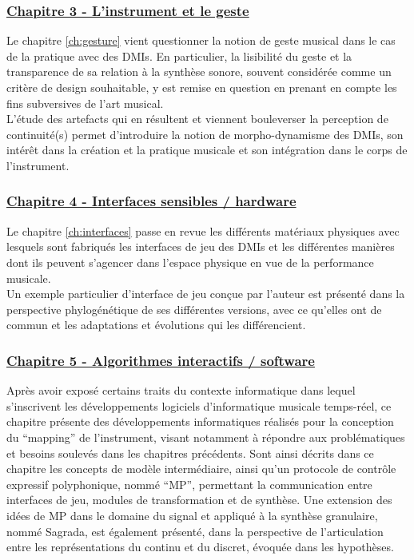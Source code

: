 \subsubsection*{\hyperref[ch:gesture]{Chapitre 3 - L'instrument et le geste}}

\noindent Le chapitre \ref{ch:gesture} vient questionner la notion de geste musical dans le cas de la pratique avec des \glspl{DMI}. En particulier, la lisibilité du geste et la transparence de sa relation à la synthèse sonore, souvent considérée comme un critère de design souhaitable, y est remise en question en prenant en compte les fins subversives de l'art musical.\\
\indent L'étude des artefacts qui en résultent et viennent bouleverser la perception de continuité(s) permet d'introduire la notion de morpho-dynamisme des \glspl{DMI}, son intérêt dans la création et la pratique musicale et son intégration dans le corps de l'instrument.

\subsubsection*{\hyperref[ch:interfaces]{Chapitre 4 - Interfaces sensibles / hardware}}

\noindent Le chapitre \ref{ch:interfaces} passe en revue les différents matériaux physiques avec lesquels sont fabriqués les interfaces de jeu des \glspl{DMI} et les différentes manières dont ils peuvent s'agencer dans l'espace physique en vue de la performance musicale.\\
\indent Un exemple particulier d'interface de jeu conçue par l'auteur est présenté dans la perspective phylogénétique de ses différentes versions, avec ce qu'elles ont de commun et les adaptations et évolutions qui les différencient.

\subsubsection*{\hyperref[ch:algorithms]{Chapitre 5 - Algorithmes interactifs / software}} 

\noindent Après avoir exposé certains traits du contexte informatique dans lequel s'inscrivent les développements logiciels d'informatique musicale temps-réel, ce chapitre présente des développements informatiques réalisés pour la conception du ``mapping'' de l'instrument, visant notamment à répondre aux problématiques et besoins soulevés dans les chapitres précédents. Sont ainsi décrits dans ce chapitre les concepts de modèle intermédiaire, ainsi qu'un protocole de contrôle expressif polyphonique, nommé ``MP'', permettant la communication entre interfaces de jeu, modules de transformation et de synthèse. Une extension des idées de MP dans le domaine du signal et appliqué à la synthèse granulaire, nommé Sagrada, est également présenté, dans la perspective de l'articulation entre les représentations du continu et du discret, évoquée dans les hypothèses.

